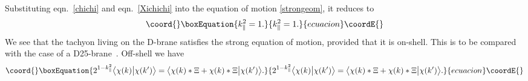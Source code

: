 \documentclass[letterpaper,12pt]{article}
\def\er#1{eqn.~\eqref{#1}}
\begin{document}
Substituting \er{chichi} and \er{Xichichi} into the equation of motion \eqref{strongeom},
it reduces to
\begin{equation}\coord{}\boxEquation{
\label{kseo}
k_\parallel^2=1
.}{
k_\parallel^2=1
.}{ecuacion}\coordE{}\end{equation}
We see that the tachyon living on the D\coordHE{}-brane satisfies the strong equation of 
motion, provided that it is on-shell. 
This is to be compared with the case of a D25-brane~\cite{RV}.
Off-shell we have
\begin{equation}\coord{}\boxEquation{
\label{OSseom}
 2^{1-k_\parallel^2}\big\langle\chi(k)\big|\chi(k')\big\rangle = 
     \big\langle \chi(k) * \Xi + \chi(k) * \Xi \big| \chi(k') \big\rangle
.}{
2^{1-k_\parallel^2}\big\langle\chi(k)\big|\chi(k')\big\rangle = 
     \big\langle \chi(k) * \Xi + \chi(k) * \Xi \big| \chi(k') \big\rangle
.}{ecuacion}\coordE{}\end{equation}
\end{document}

